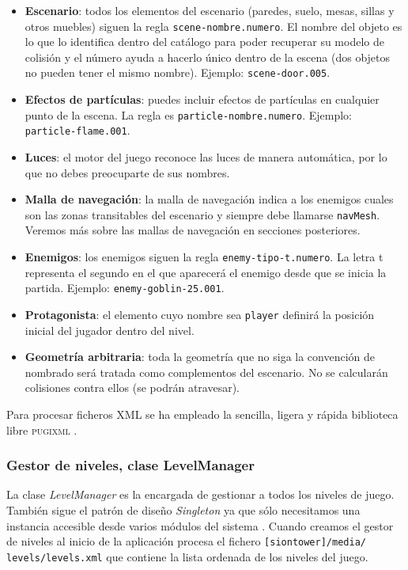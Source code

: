 \begin{itemize}
    \itemsep0em
    \item \textbf{Escenario}: todos los elementos del escenario (paredes,
    suelo, mesas, sillas y otros muebles) siguen la regla \texttt{scene-nombre.numero}.
    El nombre del objeto es lo que lo identifica dentro del catálogo para poder
    recuperar su modelo de colisión y el número ayuda a hacerlo único dentro de la
    escena (dos objetos no pueden tener el mismo nombre). Ejemplo: \texttt{scene-door.005}.
    \item \textbf{Efectos de partículas}: puedes incluir efectos de partículas
    en cualquier punto de la escena. La regla es \texttt{particle-nombre.numero}.
    Ejemplo: \texttt{particle-flame.001}.
    \item \textbf{Luces}: el motor del juego reconoce las luces de manera automática,
    por lo que no debes preocuparte de sus nombres.
    \item \textbf{Malla de navegación}: la malla de navegación indica a los
    enemigos cuales son las zonas transitables del escenario y siempre
    debe llamarse \texttt{navMesh}. Veremos más sobre las mallas de navegación
    en secciones posteriores.
    \item \textbf{Enemigos}: los enemigos siguen la regla \texttt{enemy-tipo-t.numero}.
    La letra t representa el segundo en el que aparecerá el enemigo desde
    que se inicia la partida. Ejemplo: \texttt{enemy-goblin-25.001}.
    \item \textbf{Protagonista}: el elemento cuyo nombre sea \texttt{player}
    definirá la posición inicial del jugador dentro del nivel.
    \item \textbf{Geometría arbitraria}: toda la geometría que no siga
    la convención de nombrado será tratada como complementos del escenario.
    No se calcularán colisiones contra ellos (se podrán atravesar).
\end{itemize}

Para procesar ficheros XML se ha empleado la sencilla, ligera y rápida
biblioteca libre \textsc{pugixml} \cite{website:pugixml}.\\

\subsubsection{Gestor de niveles, clase LevelManager}

La clase \textit{LevelManager} es la encargada de gestionar a todos
los niveles de juego. También sigue el patrón de diseño \textit{Singleton}
ya que sólo necesitamos una instancia accesible desde varios módulos del
sistema \cite{gamm77}. Cuando creamos el gestor de niveles al inicio
de la aplicación procesa el fichero \texttt{[siontower]/media/
levels/levels.xml}
que contiene la lista ordenada de los niveles del juego.\\

